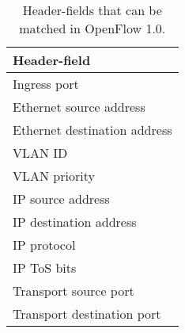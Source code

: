 \begin{table}
  \centering
  \begin{tabular}{l}
    \hline
     \textbf{Header-field} \\
    \hline
     Ingress port\index{OpenFlow!match on ingress port} \\

     Ethernet source address\index{OpenFlow!match on Ethernet} \\
     Ethernet destination address\index{OpenFlow!match on Ethernet} \\

     VLAN ID\index{OpenFlow!match on VLAN} \\
     VLAN priority\index{OpenFlow!match on VLAN} \\

     IP source address\index{OpenFlow!match on IP address} \\
     IP destination address\index{OpenFlow!match on IP address} \\
     IP protocol\index{OpenFlow!match on IP protocol} \\
     IP \ac{ToS} bits\index{OpenFlow!match on ToS} \\

     Transport source port\index{OpenFlow!UDP}\index{OpenFlow!TCP}\index{OpenFlow!transport} \\
     Transport destination port \\
    \hline
  \end{tabular}
  \caption{Header-fields that can be matched in OpenFlow 1.0.}
  \label{table:openflow-1.0.headers}
\end{table}


